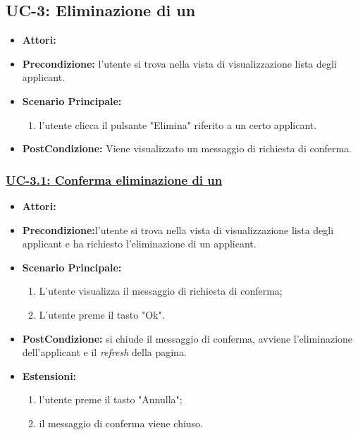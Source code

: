 \subsection{UC-3: Eliminazione di un\applicant}
\begin{itemize}
\item \textbf{Attori:}\loggedusr
\item \textbf{Precondizione:} l'utente si trova nella vista di visualizzazione lista degli applicant.
\item \textbf{Scenario Principale:}
\begin{enumerate}
	\item l'utente clicca il pulsante "Elimina" riferito a un certo applicant.
\end{enumerate}
\item \textbf{PostCondizione:} Viene visualizzato un messaggio di richiesta di conferma.
\end{itemize}

\subsubsection{\underline{UC-3.1: Conferma eliminazione di un\applicant}}
\begin{itemize}
	\item \textbf{Attori:}\loggedusr
	\item \textbf{Precondizione:}l'utente si trova nella vista di visualizzazione lista degli applicant e ha richiesto l'eliminazione di un applicant.
	\item \textbf{Scenario Principale:}
	\begin{enumerate}
		\item L'utente visualizza il messaggio di richiesta di conferma;
		\item L'utente preme il tasto "Ok".
	\end{enumerate}
	\item \textbf{PostCondizione:} si chiude il messaggio di conferma, avviene l'eliminazione dell'applicant e il \textit{refresh} della pagina.
	\item \textbf{Estensioni:} 
	\begin{enumerate}
		\item l'utente preme il tasto "Annulla";
		\item il messaggio di conferma viene chiuso.
	\end{enumerate}
\end{itemize}

